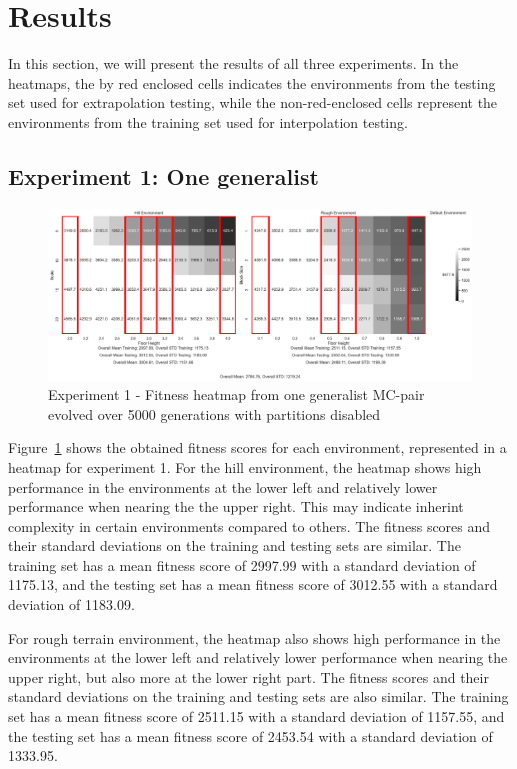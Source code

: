 \section{Results}
    In this section, we will present the results of all three experiments. In the heatmaps, the by red enclosed cells indicates the environments from the testing set used for extrapolation testing, while the non-red-enclosed cells represent the environments from the training set used for interpolation testing.
    \subsection{Experiment 1: One generalist}
        \begin{figure}[ht]
            \centering
            \includegraphics[width=\linewidth]{./resources/generalist_4_2784/fitness_heatmap.png}
            \caption{Experiment 1 - Fitness heatmap from one generalist MC-pair evolved over 5000 generations with partitions disabled}
            \label{fig:fit_heat_generalist}
        \end{figure}

        Figure~\ref{fig:fit_heat_generalist} shows the obtained fitness scores for each environment, represented in a heatmap for experiment 1. For the hill environment, the heatmap shows high performance in the environments at the lower left and relatively lower performance when nearing the the upper right. This may indicate inherint complexity in certain environments compared to others. The fitness scores and their standard deviations on the training and testing sets are similar. The training set has a mean fitness score of 2997.99 with a standard deviation of 1175.13, and the testing set has a mean fitness score of 3012.55 with a standard deviation of 1183.09. 
        
        For rough terrain environment, the heatmap also shows high performance in the environments at the lower left and relatively lower performance when nearing the upper right, but also more at the lower right part. The fitness scores and their standard deviations on the training and testing sets are also similar. The training set has a mean fitness score of 2511.15 with a standard deviation of 1157.55, and the testing set has a mean fitness score of 2453.54 with a standard deviation of 1333.95.
    
